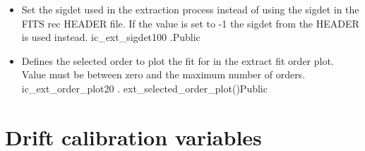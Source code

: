 \begin{itemize}
\item {} 
{Set the sigdet used in the extraction process instead of using the sigdet in the FITS rec HEADER file. If the value is set to -1 the sigdet from the HEADER is used instead.}
{ic\_ext\_sigdet}{100}
{\calextractRAW}{\constantsfile}{\calextractRAW.\progMAIN}{Public}

\item {}
{Defines the selected order to plot the fit for in the extract fit order plot. Value must be between zero and the maximum number of orders.}
{ic\_ext\_order\_plot}{20}
{\calextractRAW}{\constantsfile}{\spirouPlot. ext\_selected\_order\_plot()}{Public}

\end{itemize}







\clearpage
\newpage
\section{Drift calibration variables}
\label{ch:variables:drift}

